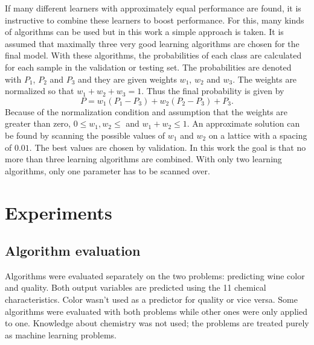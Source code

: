 \documentclass[twoside]{article}
\begin{document}
\begin{multicols}{2}
If many different learners with approximately equal performance are found, it is instructive
to combine these learners to boost performance. For this, many kinds of algorithms can be used
but in this work a simple approach is taken. It is assumed that maximally three very good
learning algorithms are chosen for the final model. With these algorithms, the probabilities
of each class are calculated for each sample in the validation or testing set. The probabilities
are denoted with $P_1$, $P_2$ and $P_3$ and they are given weights $w_1$, $w_2$ and $w_3$.
The weights are normalized so that $w_1 + w_2 + w_3 = 1$. Thus the final probability is given by
\begin{equation}
 P = w_1 ( P_1 - P_3 ) + w_2 ( P_2 - P_3 ) + P_3.
\end{equation}
Because of the normalization condition and assumption that the weights are greater than zero,  $0 \leq w_1,w_2 \leq$ and $w_1 + w_2 \leq 1$. 
An approximate solution can be found by scanning the possible values of $w_1$ and $w_2$ on a lattice with a spacing of $0.01$.
The best values are chosen by validation. In this work the goal is that no more than three learning algorithms are combined.
With only two learning algorithms, only one parameter has to be scanned over.



\section{Experiments}

\subsection{Algorithm evaluation}

Algorithms were evaluated separately on the two problems: predicting wine color and quality.
Both output variables are predicted using the 11 chemical characteristics. Color wasn't used
as a predictor for quality or vice versa.
Some algorithms were evaluated with both problems while other ones were only applied to one.
Knowledge about chemistry was not used; the problems are treated purely as machine learning
problems.


\end{multicols}
\end{document}
